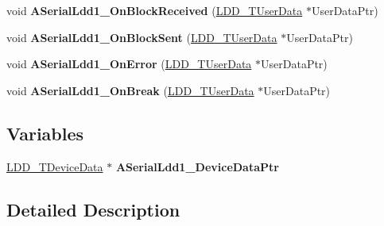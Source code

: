 \begin{DoxyCompactItemize}
\item 
\hypertarget{group___p_c__module_ga617597f21766b4f72d7f2883c21e6dd8}{void {\bfseries A\-Serial\-Ldd1\-\_\-\-On\-Block\-Received} (\hyperlink{group___p_e___types__module_ga0b66a73f87238a782318aa0be7578e35}{L\-D\-D\-\_\-\-T\-User\-Data} $\ast$User\-Data\-Ptr)}\label{group___p_c__module_ga617597f21766b4f72d7f2883c21e6dd8}

\item 
\hypertarget{group___p_c__module_ga5b8a51aef1d1fede97ee58e31c945b78}{void {\bfseries A\-Serial\-Ldd1\-\_\-\-On\-Block\-Sent} (\hyperlink{group___p_e___types__module_ga0b66a73f87238a782318aa0be7578e35}{L\-D\-D\-\_\-\-T\-User\-Data} $\ast$User\-Data\-Ptr)}\label{group___p_c__module_ga5b8a51aef1d1fede97ee58e31c945b78}

\item 
\hypertarget{group___p_c__module_gab11d6ff796e37ab8d6c35dd8cc258f9a}{void {\bfseries A\-Serial\-Ldd1\-\_\-\-On\-Error} (\hyperlink{group___p_e___types__module_ga0b66a73f87238a782318aa0be7578e35}{L\-D\-D\-\_\-\-T\-User\-Data} $\ast$User\-Data\-Ptr)}\label{group___p_c__module_gab11d6ff796e37ab8d6c35dd8cc258f9a}

\item 
\hypertarget{group___p_c__module_gaff0fe796ad334f68b2a86273f5ade786}{void {\bfseries A\-Serial\-Ldd1\-\_\-\-On\-Break} (\hyperlink{group___p_e___types__module_ga0b66a73f87238a782318aa0be7578e35}{L\-D\-D\-\_\-\-T\-User\-Data} $\ast$User\-Data\-Ptr)}\label{group___p_c__module_gaff0fe796ad334f68b2a86273f5ade786}

\end{DoxyCompactItemize}
\subsection*{Variables}
\begin{DoxyCompactItemize}
\item 
\hypertarget{group___p_c__module_ga19d4b715e209f6228d76c65b3d3e13b1}{\hyperlink{group___p_e___types__module_gac5cf1362f1f0e3a2ce71b1bf2276d091}{L\-D\-D\-\_\-\-T\-Device\-Data} $\ast$ {\bfseries A\-Serial\-Ldd1\-\_\-\-Device\-Data\-Ptr}}\label{group___p_c__module_ga19d4b715e209f6228d76c65b3d3e13b1}

\end{DoxyCompactItemize}


\subsection{Detailed Description}
